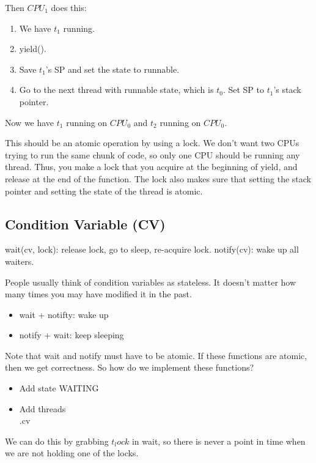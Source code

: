 \documentclass[psamsfonts]{amsart}
\begin{document}
Then $CPU_1$ does this:
\begin{enumerate}
  \item We have $t_1$ running.
  \item yield().
  \item Save $t_1$'s SP and set the state to runnable.
  \item Go to the next thread with runnable state, which is $t_0$. Set SP to $t_1$'s stack pointer.
\end{enumerate}

Now we have $t_1$ running on $CPU_0$ and $t_2$ running on $CPU_0$.

This should be an atomic operation by using a lock. We don't want two CPUs trying to run the same chunk of code, so only one CPU should be running any thread. Thus, you make a lock that you acquire at the beginning of yield, and release at the end of the function. The lock also makes sure that setting the stack pointer and setting the state of the thread is atomic.

\subsection{Condition Variable (CV)}

wait(cv, lock): release lock, go to sleep, re-acquire lock.
notify(cv): wake up all waiters.

People usually think of condition variables as stateless. It doesn't matter how many times you may have modified it in the past.
\begin{itemize}
  \item wait + notifty: wake up
  \item notify + wait: keep sleeping
\end{itemize}

Note that wait and notify must have to be atomic. If these functions are atomic, then we get correctness. So how do we implement these functions?
\begin{itemize}
  \item Add state WAITING
  \item Add threads\[\].cv
\end{itemize}

We can do this by grabbing $t_lock$ in wait, so there is never a point in time when we are not holding one of the locks.
\end{document}
